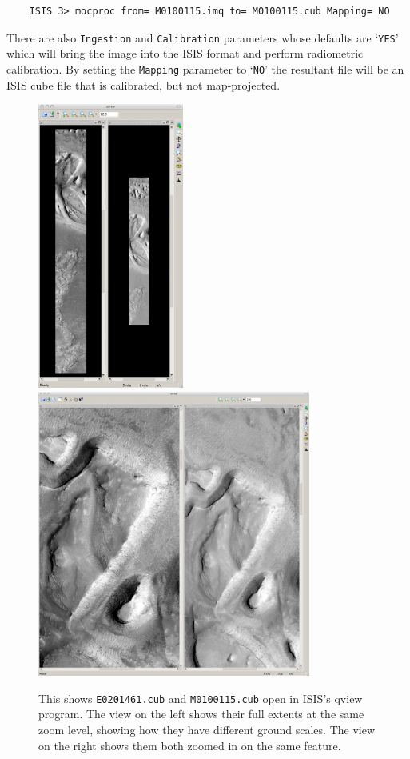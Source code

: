 \begin{verbatim}
    ISIS 3> mocproc from= M0100115.imq to= M0100115.cub Mapping= NO
\end{verbatim}
\noindent
There are also \texttt{Ingestion} and \texttt{Calibration} parameters
whose defaults are `\texttt{YES}' which will bring the image into
the ISIS format and perform radiometric calibration.  By setting
the \texttt{Mapping} parameter to `\texttt{NO}' the resultant file
will be an ISIS cube file that is calibrated, but not map-projected.

\begin{figure}[b!]
\begin{minipage}{5.2in}
\includegraphics[height=3.7in]{images/p19-images.png}
\hfill
\includegraphics[height=3.7in]{images/p19-images_zoom.png}
\end{minipage}
\hfill
\begin{minipage}{1.3in}
\caption[P19 images open in qview zoomed in]{
    \label{p19-images}
    This shows \texttt{E0201461.cub} and \texttt{M0100115.cub} open in
	ISIS's qview program.  The view on the left shows their full extents
	at the same zoom level, showing how they have different ground scales.
	The view on the right shows them both zoomed in on the same feature.
    }
\end{minipage}
\end{figure}

